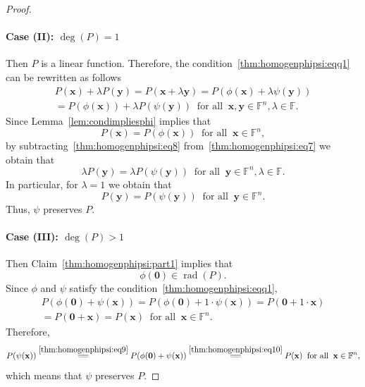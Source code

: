 \documentclass[10pt,a4paper]{amsart}
\def\F{{\mathbb F}}
\DeclareMathOperator{\rad}{rad}
\begin{document}
\begin{proof}
\paragraph{Case (II): $\deg(P) = 1$} Then $P$ is a linear function. Therefore, the condition~\eqref{thm:homogenphipsi:eqq1} can be rewritten as follows
\begin{multline}\label{thm:homogenphipsi:eq7}
P(\mathbf x) + \lambda P(\mathbf y) = P(\mathbf x + \lambda \mathbf y) = P(\phi(\mathbf x) + \lambda \psi(\mathbf y))\\ = P(\phi(\mathbf x)) + \lambda P(\psi(\mathbf y))\;\;\mbox{for all}\;\;\mathbf x, \mathbf y \in \F^n, \lambda \in \F.
\end{multline}
Since Lemma~\ref{lem:condimpliesphi} implies that
\begin{equation}\label{thm:homogenphipsi:eq8}
P(\mathbf x) = P(\phi(\mathbf x))\;\;\mbox{for all}\;\;\mathbf x \in \F^n,
\end{equation}
by subtracting~\eqref{thm:homogenphipsi:eq8} from~\eqref{thm:homogenphipsi:eq7} we obtain that
\begin{equation*}
\lambda P(\mathbf y) = \lambda P(\psi(\mathbf y))\;\;\mbox{for all}\;\;\mathbf y \in \F^n, \lambda \in \F.
\end{equation*}
In particular, for $\lambda = 1$ we obtain that
\begin{equation*}
P(\mathbf y) = P(\psi(\mathbf y))\;\;\mbox{for all}\;\;\mathbf y \in \F^n.
\end{equation*}
Thus, $\psi$ preserves $P$.

\paragraph{Case (III): $\deg(P) > 1$} Then Claim~\ref{thm:homogenphipsi:part1} implies that 
\begin{equation}\label{thm:homogenphipsi:eq9}
\phi(\mathbf 0) \in \rad(P).
\end{equation}
Since $\phi$ and $\psi$ satisfy the condition~\eqref{thm:homogenphipsi:eqq1},
\begin{multline}\label{thm:homogenphipsi:eq10}
 P(\phi(\mathbf 0) + \psi(\mathbf x)) = P(\phi(\mathbf 0) + 1\cdot \psi(\mathbf x)) = P(\mathbf 0 + 1\cdot \mathbf x)\\ = P(\mathbf 0 + \mathbf x) = P(\mathbf x)\;\;\mbox{for all}\;\;\mathbf x \in \F^n.
\end{multline}
Therefore,
\[
P(\psi(\mathbf x)) \overset{\eqref{thm:homogenphipsi:eq9}}{=\joinrel=}  P(\phi(\mathbf 0) + \psi(\mathbf x))\overset{\eqref{thm:homogenphipsi:eq10}}{=\joinrel=} P(\mathbf x)\;\;\mbox{for all}\;\;\mathbf x \in \F^n,
\]
which means that $\psi$ preserves $P$.

\end{proof}
\end{document}
